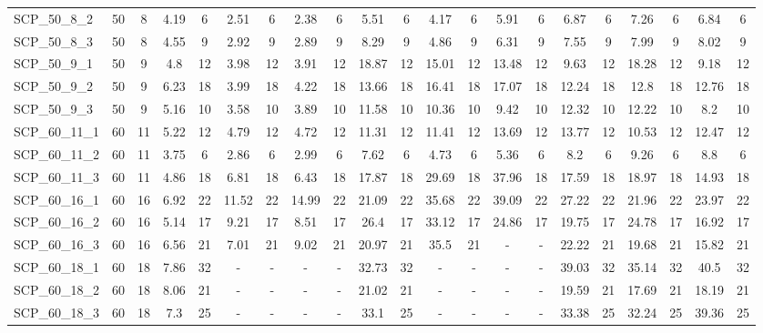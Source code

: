 \begin{sidewaystable}[!ht]
{\begin{tabular}{lcccccccccccccccccccc}
SCP\_50\_8\_2 & 50 & 8 & 4.19 & 6 & 2.51 & 6 &  \textcolor{blue2}{2.38} & 6 & 5.51 & 6 & 4.17 & 6 & 5.91 & 6 & 6.87 & 6 & 7.26 & 6 & 6.84 & 6 \\
SCP\_50\_8\_3 & 50 & 8 & 4.55 & 9 & 2.92 & 9 &  \textcolor{blue2}{2.89} & 9 & 8.29 & 9 & 4.86 & 9 & 6.31 & 9 & 7.55 & 9 & 7.99 & 9 & 8.02 & 9 \\
SCP\_50\_9\_1 & 50 & 9 & 4.8 & 12 & 3.98 & 12 &  \textcolor{blue2}{3.91} & 12 & 18.87 & 12 & 15.01 & 12 & 13.48 & 12 & 9.63 & 12 & 18.28 & 12 & 9.18 & 12 \\
SCP\_50\_9\_2 & 50 & 9 & 6.23 & 18 &  \textcolor{blue2}{3.99} & 18 & 4.22 & 18 & 13.66 & 18 & 16.41 & 18 & 17.07 & 18 & 12.24 & 18 & 12.8 & 18 & 12.76 & 18 \\
SCP\_50\_9\_3 & 50 & 9 & 5.16 & 10 &  \textcolor{blue2}{3.58} & 10 & 3.89 & 10 & 11.58 & 10 & 10.36 & 10 & 9.42 & 10 & 12.32 & 10 & 12.22 & 10 & 8.2 & 10 \\
SCP\_60\_11\_1 & 60 & 11 & 5.22 & 12 & 4.79 & 12 &  \textcolor{blue2}{4.72} & 12 & 11.31 & 12 & 11.41 & 12 & 13.69 & 12 & 13.77 & 12 & 10.53 & 12 & 12.47 & 12 \\
SCP\_60\_11\_2 & 60 & 11 & 3.75 & 6 &  \textcolor{blue2}{2.86} & 6 & 2.99 & 6 & 7.62 & 6 & 4.73 & 6 & 5.36 & 6 & 8.2 & 6 & 9.26 & 6 & 8.8 & 6 \\
SCP\_60\_11\_3 & 60 & 11 &  \textcolor{blue2}{4.86} & 18 & 6.81 & 18 & 6.43 & 18 & 17.87 & 18 & 29.69 & 18 & 37.96 & 18 & 17.59 & 18 & 18.97 & 18 & 14.93 & 18 \\
SCP\_60\_16\_1 & 60 & 16 &  \textcolor{blue2}{6.92} & 22 & 11.52 & 22 & 14.99 & 22 & 21.09 & 22 & 35.68 & 22 & 39.09 & 22 & 27.22 & 22 & 21.96 & 22 & 23.97 & 22 \\
SCP\_60\_16\_2 & 60 & 16 &  \textcolor{blue2}{5.14} & 17 & 9.21 & 17 & 8.51 & 17 & 26.4 & 17 & 33.12 & 17 & 24.86 & 17 & 19.75 & 17 & 24.78 & 17 & 16.92 & 17 \\
SCP\_60\_16\_3 & 60 & 16 &  \textcolor{blue2}{6.56} & 21 & 7.01 & 21 & 9.02 & 21 & 20.97 & 21 & 35.5 & 21 &  - &  - & 22.22 & 21 & 19.68 & 21 & 15.82 & 21 \\
SCP\_60\_18\_1 & 60 & 18 &  \textcolor{blue2}{7.86} & 32 &  - &  - &  - &  - & 32.73 & 32 &  - &  - &  - &  - & 39.03 & 32 & 35.14 & 32 & 40.5 & 32 \\
SCP\_60\_18\_2 & 60 & 18 &  \textcolor{blue2}{8.06} & 21 &  - &  - &  - &  - & 21.02 & 21 &  - &  - &  - &  - & 19.59 & 21 & 17.69 & 21 & 18.19 & 21 \\
SCP\_60\_18\_3 & 60 & 18 &  \textcolor{blue2}{7.3} & 25 &  - &  - &  - &  - & 33.1 & 25 &  - &  - &  - &  - & 33.38 & 25 & 32.24 & 25 & 39.36 & 25 \\

\end{tabular}}
\end{sidewaystable}
